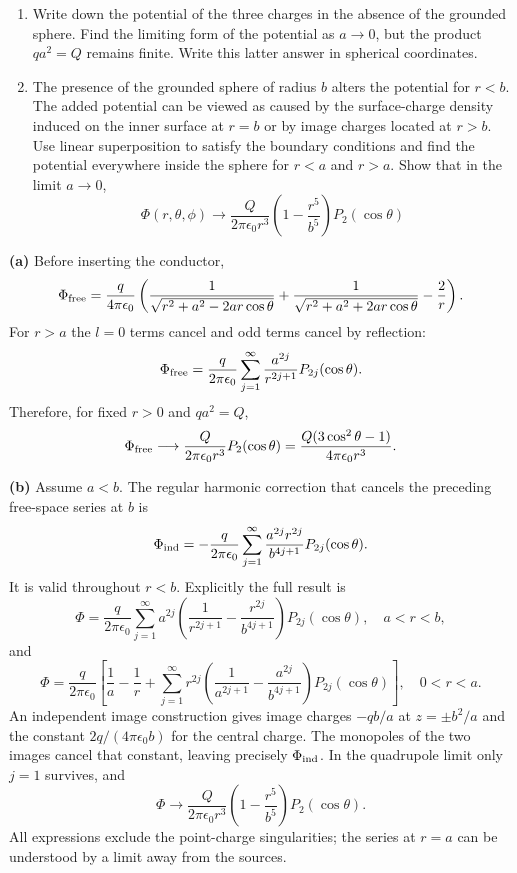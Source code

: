 \begin{enumerate}
\item[(a)] Write down the potential of the three charges in the absence of the grounded sphere. Find the limiting form of the potential as $a\to0$, but the product $qa^{2}=Q$ remains finite. Write this latter answer in spherical coordinates.
\item[(b)] The presence of the grounded sphere of radius $b$ alters the potential for $r<b$. The added potential can be viewed as caused by the surface-charge density induced on the inner surface at $r=b$ or by image charges located at $r>b$. Use linear superposition to satisfy the boundary conditions and find the potential everywhere inside the sphere for $r<a$ and $r>a$. Show that in the limit $a\to0$,
\[
\Phi(r,\theta,\phi)\to\frac{Q}{2\pi\epsilon_{0}r^{3}}\left(1-\frac{r^{5}}{b^{5}}\right)P_{2}(\cos\theta)
\]
\end{enumerate}
\solution

\textbf{(a)} Before inserting the conductor,
\[
\Phi_{\rm free}=\frac{q}{4\pi\epsilon_0}
\left(\frac1{\sqrt{r^2+a^2-2ar\cos\theta}}
+\frac1{\sqrt{r^2+a^2+2ar\cos\theta}}-\frac2r\right).
\]
For $r>a$ the $l=0$ terms cancel and odd terms cancel by reflection:
\[
\Phi_{\rm free}=\frac{q}{2\pi\epsilon_0}
\sum_{j=1}^\infty\frac{a^{2j}}{r^{2j+1}}P_{2j}(\cos\theta).
\]
Therefore, for fixed $r>0$ and $qa^2=Q$,
\[
\Phi_{\rm free}\longrightarrow
\frac{Q}{2\pi\epsilon_0r^3}P_2(\cos\theta)
=\frac{Q(3\cos^2\theta-1)}{4\pi\epsilon_0r^3}.
\]

\textbf{(b)} Assume $a<b$.  The regular harmonic correction that
cancels the preceding free-space series at $b$ is
\[
\Phi_{\rm ind}=-\frac{q}{2\pi\epsilon_0}
\sum_{j=1}^\infty\frac{a^{2j}r^{2j}}{b^{4j+1}}P_{2j}(\cos\theta).
\]
It is valid throughout $r<b$.  Explicitly the full result is
\[
\boxed{\Phi=\frac{q}{2\pi\epsilon_0}
\sum_{j=1}^\infty a^{2j}
\left(\frac1{r^{2j+1}}-\frac{r^{2j}}{b^{4j+1}}\right)
P_{2j}(\cos\theta),\quad a<r<b,}
\]
and
\[
\boxed{\Phi=\frac{q}{2\pi\epsilon_0}\left[
\frac1a-\frac1r+
\sum_{j=1}^\infty r^{2j}
\left(\frac1{a^{2j+1}}-\frac{a^{2j}}{b^{4j+1}}\right)
P_{2j}(\cos\theta)\right],\quad0<r<a.}
\]
An independent image construction gives image charges $-qb/a$ at
$z=\pm b^2/a$ and the constant $2q/(4\pi\epsilon_0b)$ for the
central charge.  The monopoles of the two images cancel that constant,
leaving precisely $\Phi_{\rm ind}$.  In the quadrupole limit only
$j=1$ survives, and
\[
\boxed{\Phi\longrightarrow\frac{Q}{2\pi\epsilon_0r^3}
\left(1-\frac{r^5}{b^5}\right)P_2(\cos\theta).}
\]
All expressions exclude the point-charge singularities; the series at
$r=a$ can be understood by a limit away from the sources.

